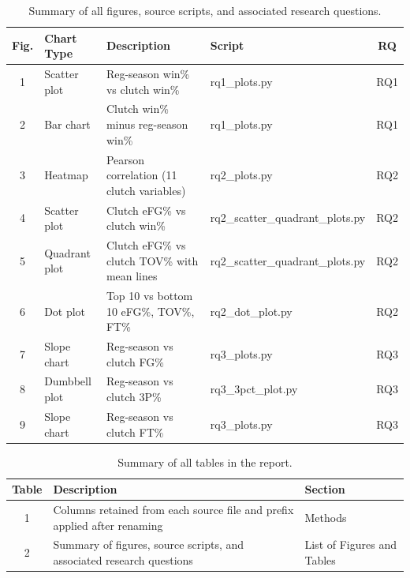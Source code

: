 \documentclass[12pt]{article}
\begin{document}
\begin{table}[ht]
    \centering
    \caption{Summary of all figures, source scripts, and associated research questions.}
    \label{tab:figures}
    \renewcommand{\arraystretch}{1.4}
    \small
    \begin{tabular}{@{} c l p{5.5cm} l c @{}}
        \toprule
        \textbf{Fig.} & \textbf{Chart Type} & \textbf{Description} & \textbf{Script} & \textbf{RQ} \\
        \midrule
        1 & Scatter plot   & Reg-season win\% vs clutch win\%                        & rq1\_plots.py                        & RQ1 \\
        2 & Bar chart      & Clutch win\% minus reg-season win\%                     & rq1\_plots.py                        & RQ1 \\
        3 & Heatmap        & Pearson correlation (11 clutch variables)              & rq2\_plots.py                        & RQ2 \\
        4 & Scatter plot   & Clutch eFG\% vs clutch win\%                            & rq2\_scatter\_quadrant\_plots.py     & RQ2 \\
        5 & Quadrant plot  & Clutch eFG\% vs clutch TOV\% with mean lines            & rq2\_scatter\_quadrant\_plots.py     & RQ2 \\
        6 & Dot plot       & Top 10 vs bottom 10 eFG\%, TOV\%, FT\%             & rq2\_dot\_plot.py                    & RQ2 \\
        7 & Slope chart    & Reg-season vs clutch FG\%                     & rq3\_plots.py                        & RQ3 \\
        8 & Dumbbell plot  & Reg-season vs clutch 3P\%                     & rq3\_3pct\_plot.py                   & RQ3 \\
        9 & Slope chart    & Reg-season vs clutch FT\%                     & rq3\_plots.py                        & RQ3 \\
        \bottomrule
    \end{tabular}
\end{table}

\begin{table}[ht]
    \centering
    \caption{Summary of all tables in the report.}
    \label{tab:tables}
    \renewcommand{\arraystretch}{1.4}
    \small
    \begin{tabular}{@{} c p{7cm} l @{}}
        \toprule
        \textbf{Table} & \textbf{Description} & \textbf{Section} \\
        \midrule
        1 & Columns retained from each source file and prefix applied after renaming & Methods \\
        2 & Summary of figures, source scripts, and associated research questions & List of Figures and Tables \\
        \bottomrule
    \end{tabular}
\end{table}


\nocite{*}

\end{document}
